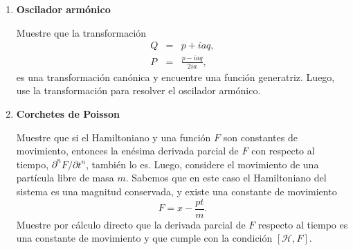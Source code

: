 \documentclass[a4paper,12pt]{article}
\begin{document}
\begin{enumerate}
  \item {\bf{Oscilador armónico}}

    Muestre que la transformación 
    \begin{eqnarray*}
      Q &=& p + i a q,\\
      P &=& \frac{p - i a q}{2 i a},
    \end{eqnarray*}
    es una transformación canónica y encuentre una función generatriz. Luego,
    use la transformación para resolver el oscilador armónico.

  \item {\bf{Corchetes de Poisson}}

    Muestre que si el Hamiltoniano y una función $F$ son constantes de
    movimiento, entonces la enésima derivada parcial de $F$ con respecto al
    tiempo, $\partial^n F/\partial t^n$, también lo es. Luego, considere el
    movimiento de una partícula libre de masa $m$. Sabemos que en este caso el
    Hamiltoniano del sistema es una magnitud conservada, y existe una constante
    de movimiento
    \[ F = x - \frac{p t}{m}.\]
    Muestre por cálculo directo que la derivada parcial de $F$ respecto al
    tiempo es una constante de movimiento y que cumple con la condición
    $[\mathcal{H}, F]$.

\end{enumerate}
\end{document}
